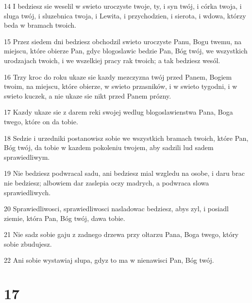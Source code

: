 \par 14 I bedziesz sie weselil w swieto uroczyste twoje, ty, i syn twój, i córka twoja, i sluga twój, i sluzebnica twoja, i Lewita, i przychodzien, i sierota, i wdowa, którzy beda w bramach twoich.
\par 15 Przez siedem dni bedziesz obchodzil swieto uroczyste Panu, Bogu twemu, na miejscu, które obierze Pan, gdyc blogoslawic bedzie Pan, Bóg twój, we wszystkich urodzajach twoich, i we wszelkiej pracy rak twoich; a tak bedziesz wesól.
\par 16 Trzy kroc do roku ukaze sie kazdy mezczyzna twój przed Panem, Bogiem twoim, na miejscu, które obierze, w swieto przasników, i w swieto tygodni, i w swieto kuczek, a nie ukaze sie nikt przed Panem prózny.
\par 17 Kazdy ukaze sie z darem reki swojej wedlug blogoslawienstwa Pana, Boga twego, które on da tobie.
\par 18 Sedzie i urzedniki postanowisz sobie we wszystkich bramach twoich, które Pan, Bóg twój, da tobie w kazdem pokoleniu twojem, aby sadzili lud sadem sprawiedliwym.
\par 19 Nie bedziesz podwracal sadu, ani bedziesz mial wzgledu na osobe, i daru brac nie bedziesz; albowiem dar zaslepia oczy madrych, a podwraca slowa sprawiedliwych.
\par 20 Sprawiedliwosci, sprawiedliwosci nasladowac bedziesz, abys zyl, i posiadl ziemie, która Pan, Bóg twój, dawa tobie.
\par 21 Nie sadz sobie gaju z zadnego drzewa przy oltarzu Pana, Boga twego, który sobie zbudujesz.
\par 22 Ani sobie wystawiaj slupa, gdyz to ma w nienawisci Pan, Bóg twój.

\chapter{17}


